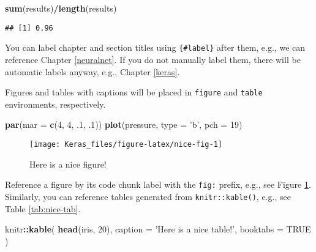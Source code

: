 \documentclass[
]{book}
\newenvironment{Shaded}{\begin{snugshade}}{\end{snugshade}}
\newcommand{\DataTypeTok}[1]{\textcolor[rgb]{0.13,0.29,0.53}{#1}}
\newcommand{\DecValTok}[1]{\textcolor[rgb]{0.00,0.00,0.81}{#1}}
\newcommand{\FloatTok}[1]{\textcolor[rgb]{0.00,0.00,0.81}{#1}}
\newcommand{\KeywordTok}[1]{\textcolor[rgb]{0.13,0.29,0.53}{\textbf{#1}}}
\newcommand{\NormalTok}[1]{#1}
\newcommand{\OperatorTok}[1]{\textcolor[rgb]{0.81,0.36,0.00}{\textbf{#1}}}
\newcommand{\OtherTok}[1]{\textcolor[rgb]{0.56,0.35,0.01}{#1}}
\newcommand{\StringTok}[1]{\textcolor[rgb]{0.31,0.60,0.02}{#1}}
\begin{document}
\begin{Shaded}
\begin{Highlighting}[]
\KeywordTok{sum}\NormalTok{(results)}\OperatorTok{/}\KeywordTok{length}\NormalTok{(results)}
\end{Highlighting}
\end{Shaded}

\begin{verbatim}
## [1] 0.96
\end{verbatim}

You can label chapter and section titles using \texttt{\{\#label\}} after them, e.g., we can reference Chapter \ref{neuralnet}. If you do not manually label them, there will be automatic labels anyway, e.g., Chapter \ref{keras}.

Figures and tables with captions will be placed in \texttt{figure} and \texttt{table} environments, respectively.

\begin{Shaded}
\begin{Highlighting}[]
\KeywordTok{par}\NormalTok{(}\DataTypeTok{mar =} \KeywordTok{c}\NormalTok{(}\DecValTok{4}\NormalTok{, }\DecValTok{4}\NormalTok{, }\FloatTok{.1}\NormalTok{, }\FloatTok{.1}\NormalTok{))}
\KeywordTok{plot}\NormalTok{(pressure, }\DataTypeTok{type =} \StringTok{'b'}\NormalTok{, }\DataTypeTok{pch =} \DecValTok{19}\NormalTok{)}
\end{Highlighting}
\end{Shaded}

\begin{figure}

{\centering \texttt{[image: Keras\_files/figure-latex/nice-fig-1]} 

}

\caption{Here is a nice figure!}\label{fig:nice-fig}
\end{figure}

Reference a figure by its code chunk label with the \texttt{fig:} prefix, e.g., see Figure \ref{fig:nice-fig}. Similarly, you can reference tables generated from \texttt{knitr::kable()}, e.g., see Table \ref{tab:nice-tab}.

\begin{Shaded}
\begin{Highlighting}[]
\NormalTok{knitr}\OperatorTok{::}\KeywordTok{kable}\NormalTok{(}
  \KeywordTok{head}\NormalTok{(iris, }\DecValTok{20}\NormalTok{), }\DataTypeTok{caption =} \StringTok{'Here is a nice table!'}\NormalTok{,}
  \DataTypeTok{booktabs =} \OtherTok{TRUE}
\NormalTok{)}
\end{Highlighting}
\end{Shaded}
\end{document}
